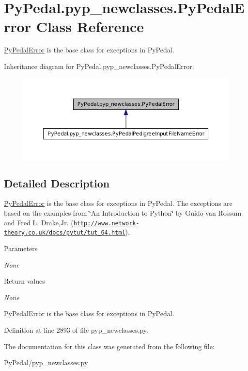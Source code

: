 \hypertarget{classPyPedal_1_1pyp__newclasses_1_1PyPedalError}{
\section{PyPedal.pyp\_\-newclasses.PyPedalError Class Reference}
\label{classPyPedal_1_1pyp__newclasses_1_1PyPedalError}
}


\hyperlink{classPyPedal_1_1pyp__newclasses_1_1PyPedalError}{PyPedalError} is the base class for exceptions in PyPedal.  




Inheritance diagram for PyPedal.pyp\_\-newclasses.PyPedalError:\nopagebreak
\begin{figure}[H]
\begin{center}
\leavevmode
\includegraphics[width=400pt]{classPyPedal_1_1pyp__newclasses_1_1PyPedalError__inherit__graph}
\end{center}
\end{figure}


\subsection{Detailed Description}
\hyperlink{classPyPedal_1_1pyp__newclasses_1_1PyPedalError}{PyPedalError} is the base class for exceptions in PyPedal. The exceptions are based on the examples from \char`\"{}An Introduction to Python\char`\"{} by Guido van Rossum and Fred L. Drake,Jr. (\href{http://www.network-theory.co.uk/docs/pytut/tut_64.html}{\tt http://www.network-\/theory.co.uk/docs/pytut/tut\_\-64.html}). 
\begin{DoxyParams}{Parameters}
\item[{\em None}]\end{DoxyParams}

\begin{DoxyRetVals}{Return values}
\item[{\em None}]\begin{DoxyVerb}PyPedalError is the base class for exceptions in PyPedal.\end{DoxyVerb}
 \end{DoxyRetVals}


Definition at line 2893 of file pyp\_\-newclasses.py.



The documentation for this class was generated from the following file:\begin{DoxyCompactItemize}
\item 
PyPedal/pyp\_\-newclasses.py\end{DoxyCompactItemize}
